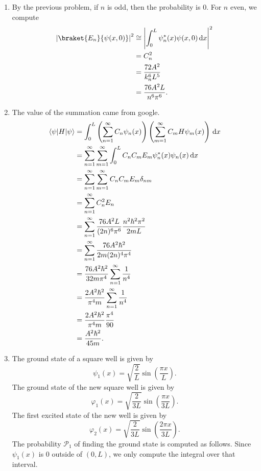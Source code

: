 \documentclass[11pt, letterpaper]{article}
\begin{document}
\begin{enumerate}
\begin{align*}
		.\end{align*}
	\item By the previous problem, if $n$ is odd, then the probability is 0. For $n$ even, we compute
		\begin{align*}
			\left| \braket{E_n}{\psi(x,0)}  \right| ^2&\cong\left| \int_{0}^{L} \psi_n^*(x)\psi (x,0) \,\mathrm{d} x\right|^2\\
			&=C_n^2\\
			&=\frac{72A^2}{k_n^6L^5}\\
			&=\frac{76A^2L}{n^6\pi ^6} 
		.\end{align*}
	\item The value of the summation came from google.
		\begin{align*}
			\langle\psi\rvert H\lvert\psi \rangle &=\int_{0}^{L} \left( \sum_{n=1}^{\infty} C_n\psi_n(x) \right) \left( \sum_{m=1}^{\infty} C_mH\psi_m(x) \right)  \,\mathrm{d} x\\
						&=\sum_{n=1}^{\infty} \sum_{m=1}^{\infty} \int_{0}^{L}C_nC_mE_m\psi_n^*(x)\psi _n(x)  \,\mathrm{d} x\\
						&=\sum_{n=1}^{\infty} \sum_{m=1}^{\infty} C_nC_mE_m\delta_{nm} \\
						&=\sum_{n=1}^{\infty} C_n^2E_n\\
						&=\sum_{n=1}^{\infty} \frac{76A^2L}{(2n)^6\pi ^6} \frac{n^2\hbar ^2\pi ^2}{2mL} \\
						&=\sum_{n=1}^{\infty} \frac{76A^2\hbar ^2}{2m(2n)^4\pi ^4} \\
						&=\frac{76A^2\hbar ^2}{32m\pi ^4} \sum_{n=1}^{\infty} \frac{1}{n^4} \\
						&=\frac{2A^2\hbar ^2}{\pi ^4m} \sum_{n=1}^{\infty} \frac{1}{n^4} \\
						&=\frac{2A^2\hbar ^2}{\pi ^4m} \frac{\pi ^4}{90} \\
						&=\frac{A^2\hbar ^2}{45m} 
		.\end{align*}
	\item The ground state of a square well is given by
		\[
			\psi_1(x)=\sqrt{\frac{2}{L} } \sin \left( \frac{\pi x}{L}  \right) 
		.\]
		The ground state of the new square well is given by
		\[
			\varphi_1(x)=\sqrt{\frac{2}{3L} }  \sin \left( \frac{\pi x}{3L}  \right) 
		.\]
		The first excited state of the new well is given by
		\[
			\varphi_2(x)=\sqrt{\frac{2}{3L} } \sin \left( \frac{2\pi x}{3L}  \right) 
		.\]
		The probability $\mathcal{P}_1$ of finding the ground state is computed as follows. Since $\psi _1(x)$ is $0$ outside of $(0,L)$, we only compute the integral over that interval.

\end{enumerate}
\end{document}
